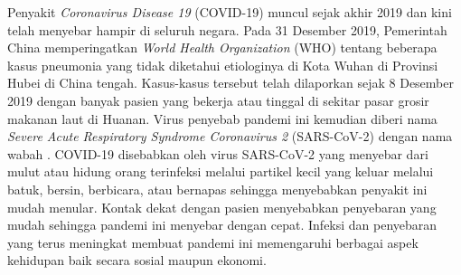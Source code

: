 



Penyakit \textit{Coronavirus Disease 19} (COVID-19) muncul sejak akhir 2019 dan kini telah menyebar hampir di seluruh negara. Pada 31 Desember 2019, Pemerintah China memperingatkan \textit{World Health Organization} (WHO) tentang beberapa kasus pneumonia yang tidak diketahui etiologinya di Kota Wuhan di Provinsi Hubei di China tengah\cite{a1}. Kasus-kasus tersebut telah dilaporkan sejak 8 Desember 2019 dengan banyak pasien yang bekerja atau tinggal di sekitar pasar grosir makanan laut di Huanan.
Virus penyebab pandemi ini kemudian diberi nama \textit{Severe Acute Respiratory Syndrome Coronavirus 2} (SARS-CoV-2) dengan nama wabah \covid\cite{a2}.
COVID-19 disebabkan oleh virus SARS-CoV-2 yang menyebar dari mulut atau hidung orang terinfeksi melalui partikel kecil yang keluar melalui batuk, bersin, berbicara, atau bernapas sehingga menyebabkan penyakit ini mudah menular. Kontak dekat dengan pasien menyebabkan penyebaran yang mudah sehingga pandemi ini menyebar dengan cepat. Infeksi dan penyebaran yang terus meningkat membuat pandemi ini memengaruhi berbagai aspek kehidupan baik secara sosial maupun ekonomi.

